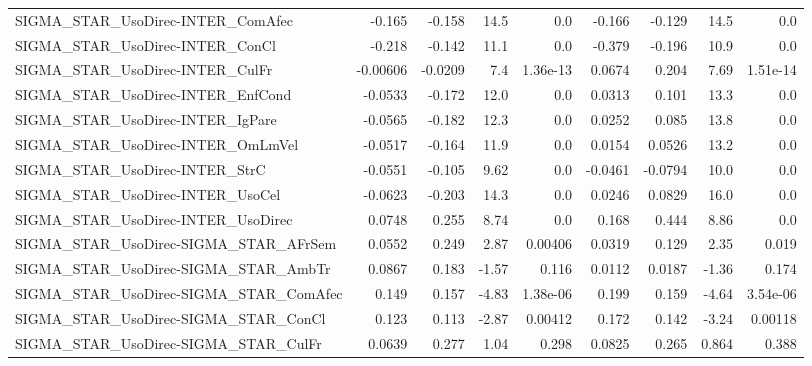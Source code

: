 \begin{tabular}{lrrrrrrrr}
SIGMA\_STAR\_UsoDirec-INTER\_ComAfec      &      -0.165 &       -0.158 &    14.5 &      0.0 &     -0.166 &      -0.129 &         14.5 &           0.0 \\
SIGMA\_STAR\_UsoDirec-INTER\_ConCl        &      -0.218 &       -0.142 &    11.1 &      0.0 &     -0.379 &      -0.196 &         10.9 &           0.0 \\
SIGMA\_STAR\_UsoDirec-INTER\_CulFr        &    -0.00606 &      -0.0209 &     7.4 & 1.36e-13 &     0.0674 &       0.204 &         7.69 &      1.51e-14 \\
SIGMA\_STAR\_UsoDirec-INTER\_EnfCond      &     -0.0533 &       -0.172 &    12.0 &      0.0 &     0.0313 &       0.101 &         13.3 &           0.0 \\
SIGMA\_STAR\_UsoDirec-INTER\_IgPare       &     -0.0565 &       -0.182 &    12.3 &      0.0 &     0.0252 &       0.085 &         13.8 &           0.0 \\
SIGMA\_STAR\_UsoDirec-INTER\_OmLmVel      &     -0.0517 &       -0.164 &    11.9 &      0.0 &     0.0154 &      0.0526 &         13.2 &           0.0 \\
SIGMA\_STAR\_UsoDirec-INTER\_StrC         &     -0.0551 &       -0.105 &    9.62 &      0.0 &    -0.0461 &     -0.0794 &         10.0 &           0.0 \\
SIGMA\_STAR\_UsoDirec-INTER\_UsoCel       &     -0.0623 &       -0.203 &    14.3 &      0.0 &     0.0246 &      0.0829 &         16.0 &           0.0 \\
SIGMA\_STAR\_UsoDirec-INTER\_UsoDirec     &      0.0748 &        0.255 &    8.74 &      0.0 &      0.168 &       0.444 &         8.86 &           0.0 \\
SIGMA\_STAR\_UsoDirec-SIGMA\_STAR\_AFrSem  &      0.0552 &        0.249 &    2.87 &  0.00406 &     0.0319 &       0.129 &         2.35 &         0.019 \\
SIGMA\_STAR\_UsoDirec-SIGMA\_STAR\_AmbTr   &      0.0867 &        0.183 &   -1.57 &    0.116 &     0.0112 &      0.0187 &        -1.36 &         0.174 \\
SIGMA\_STAR\_UsoDirec-SIGMA\_STAR\_ComAfec &       0.149 &        0.157 &   -4.83 & 1.38e-06 &      0.199 &       0.159 &        -4.64 &      3.54e-06 \\
SIGMA\_STAR\_UsoDirec-SIGMA\_STAR\_ConCl   &       0.123 &        0.113 &   -2.87 &  0.00412 &      0.172 &       0.142 &        -3.24 &       0.00118 \\
SIGMA\_STAR\_UsoDirec-SIGMA\_STAR\_CulFr   &      0.0639 &        0.277 &    1.04 &    0.298 &     0.0825 &       0.265 &        0.864 &         0.388 \\

\end{tabular}
